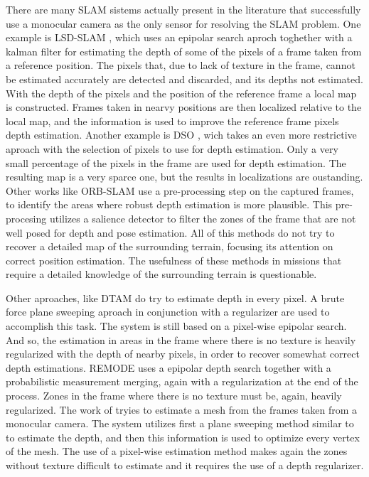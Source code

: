 \documentclass[1p]{elsarticle}
\begin{document}
There are many SLAM sistems actually present in the literature that successfully use a monocular camera as the only sensor for resolving the SLAM problem. One example is LSD-SLAM \cite{Engel_et_al_2014}, which uses an epipolar search aproch toghether with a kalman filter for estimating the depth of some of the pixels of a frame taken from a reference position. The pixels that, due to lack of texture in the frame, cannot be estimated accurately are detected and discarded, and its depths not estimated. With the depth of the pixels and the position of the reference frame a local map is constructed. Frames taken in nearvy positions are then localized relative to the local map, and the information is used to improve the reference frame pixels depth estimation. Another example is DSO \cite{Engel-et-al-pami2018}, wich takes an even more restrictive aproach with the selection of pixels to use for depth estimation. Only a very small percentage of the pixels in the frame are used for depth estimation. The resulting map is a very sparce one, but the results in localizations are oustanding. Other works like ORB-SLAM \cite{Mur-Artal_et_al_2015} use a pre-processing step on the captured frames, to identify the areas where robust depth estimation is more plausible. This pre-procesing utilizes a salience detector to filter the zones of the frame that are not well posed for depth and pose estimation. All of this methods do not try to recover a detailed map of the surrounding terrain, focusing its attention on correct position estimation. The usefulness of these methods in missions that require a detailed knowledge of the surrounding terrain is questionable.

Other aproaches, like DTAM \cite{Newcombe_et_al_2011a} do try to estimate depth in every pixel. A brute force plane sweeping aproach \cite{Hosni_et_al_2013} in conjunction with a regularizer are used to accomplish this task. The system is still based on a pixel-wise epipolar search. And so, the estimation in areas in the frame where there is no texture is heavily regularized with the depth of nearby pixels, in order to recover somewhat correct depth estimations.
REMODE \cite{Pizzoli_et_al_2014} uses a epipolar depth search together with a probabilistic measurement merging, again with a regularization at the end of the process. Zones in the frame where there is no texture must be, again, heavily regularized.
The work of \cite{Zienkiewicz_et_al_2016} tryies to estimate a mesh from the frames taken from a monocular camera. The system utilizes first a plane sweeping method similar to \cite{Newcombe_et_al_2011a} to estimate the depth, and then this information is used to optimize every vertex of the mesh. The use of a pixel-wise estimation method makes again the zones without texture difficult to estimate and it requires the use of a depth regularizer.
\end{document}
